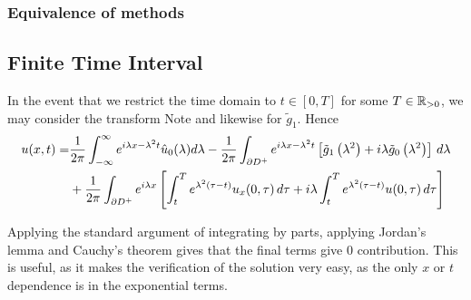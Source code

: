 \documentclass{article}
\begin{document}
\subsubsection{Equivalence of methods}


\subsection{Finite Time Interval}
In the event that we restrict the time domain to $t \in [0,T]$ for some $T \in \mathbb{R}_{>0}$, we may consider the transform 
Note 
and likewise for $\tilde{g}_1$. Hence 
\begin{align}
 u ( x , t ) =& \frac { 1 } { 2 \pi } \int _ { - \infty } ^ { \infty } e ^ { i \lambda x - \lambda ^ { 2 } t } \hat { u } _ { 0 } ( \lambda ) d \lambda - \frac { 1 } { 2 \pi } \int _ { \partial D ^ { + } } e ^ { i \lambda x - \lambda ^ { 2 } t } \left[ \tilde { g } _ { 1 } \left( \lambda ^ { 2 }  \right) + i \lambda \tilde { g } _ { 0 } \left( \lambda ^ { 2 }  \right) \right] \, d \lambda   \\
 & +\frac{1}{2\pi} \int_{\partial D^+} e^{i\lambda x} \left[ \int_t^T e^{\lambda^2(\tau-t)} u_x(0,\tau) \, d\tau + i\lambda \int_t^T e^{\lambda^2(\tau-t)} u(0,\tau) \, d\tau \right]
\end{align}

Applying the standard argument of integrating by parts, applying Jordan's lemma and Cauchy's theorem gives that the final terms give 0 contribution. This is useful, as it makes the verification of the solution very easy, as the only $x$ or $t$ dependence is in the exponential terms. 

\end{document}
